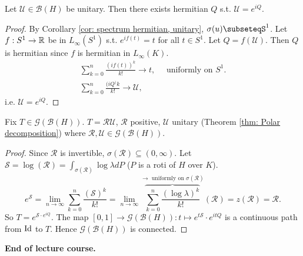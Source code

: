 \documentclass{article}
\begin{document}
\begin{theorem}\label{thm: Unitaries as exp}
    Let $\mathcal{U}\in\mathcal{B}(H)$ be unitary. Then there exists hermitian $Q$ s.t. $\mathcal{U}=e^{iQ}$.
\end{theorem}

\begin{proof}
    By Corollary \ref{cor: spectrum hermitian, unitary}, $\sigma(u)\subseteqS^1$. Let $f:S^1\to \mathbb{R}$ be in $L_\infty(S^1)$ s.t. $e^{if(t)}=t$ for all $t\in S^1$. Let $Q=f(\mathcal{U})$. Then $Q$ is hermitian since $f$ is hermitian in $L_\infty(K)$. 
    $$
    \begin{array}{ll}
        \displaystyle\sum^n_{k=0}\frac{(if(t))^k}{k!}\to t, \quad \text{ uniformly on } S^1.\\
        \displaystyle\sum^n_{k=0}\frac{(iQ^)k}{k!}\to \mathcal{U},
    \end{array}
    $$
    i.e. $\mathcal{U}=e^{iQ}$.
\end{proof}

\begin{theorem}\label{thm: Connectedness of G(B(H))}
    Fix $T\in \mathcal{G}(\mathcal{B}(H))$. $T = \mathcal{R}\mathcal{U}$, $\mathcal{R}$ positive,  $\mathcal{U}$ unitary (Theorem \ref{thm: Polar decomposition}) where $\mathcal{R}, \mathcal{U}\in \mathcal{G}(\mathcal{B}(H))$.
\end{theorem}

\begin{proof}
    Since $\mathcal{R}$ is invertible, $\sigma(\mathcal{R})\subseteq(0,\infty)$. Let $\mathcal{S}=\log(\mathcal{R})= \displaystyle\int_{\sigma(\mathcal{R})} \log\lambda dP$ ($P$ is a roti of $H$ over $K$).\\
    $$
    e^{\mathcal{S}} = \displaystyle\lim_{n\to\infty}\displaystyle\sum^n_{k=0}\frac{(\mathcal{S})^k}{k!}=\displaystyle\lim_{n\to\infty}\overbrace{\displaystyle\sum^n_{k=0}\frac{(\log \lambda)^k}{k!}}^{\to \text{ uniformly on } \sigma(\mathcal{R})}(\mathcal{R}) = z(\mathcal{R}) = \mathcal{R}.
    $$
    So $T = e^{\mathcal{S}\cdot e^{iQ}}$. The map $[0,1]\to \mathcal{G}(\mathcal{B}(H)): t\mapsto e^{t\mathcal{S}}\cdot e^{itQ}$ is a continuous path from $\operatorname{Id}$ to $T$. Hence $\mathcal{G}(\mathcal{B}(H))$ is connected.
\end{proof}

\vspace{2cm}
\begin{center}
    \textbf{End of lecture course.}
\end{center}
\end{document}
